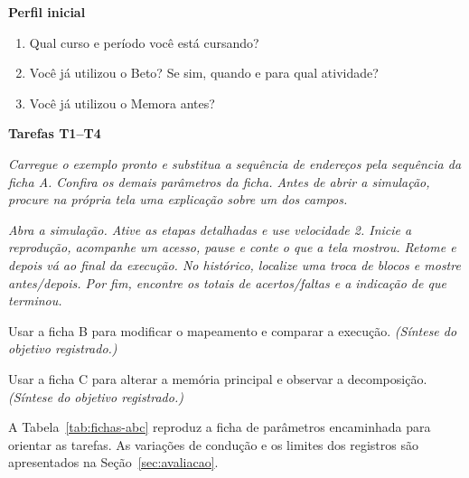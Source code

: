 
\textbf{Perfil inicial}
\begin{enumerate}
\item Qual curso e período você está cursando?
\item Você já utilizou o Beto? Se sim, quando e para qual atividade?
\item Você já utilizou o Memora antes?
\end{enumerate}


\textbf{Tarefas T1--T4}
\begin{description}[style=nextline,labelindent=0pt,leftmargin=0pt,labelsep=0pt,itemsep=3pt]
\item[\textbf{T1 --- Configuração e ajuda.}] \emph{Carregue o exemplo pronto e substitua a sequência de endereços pela sequência da ficha A. Confira os demais parâmetros da ficha. Antes de abrir a simulação, procure na própria tela uma explicação sobre um dos campos.}
\item[\textbf{T2 --- Execução e histórico.}] \emph{Abra a simulação. Ative as etapas detalhadas e use velocidade 2. Inicie a reprodução, acompanhe um acesso, pause e conte o que a tela mostrou. Retome e depois vá ao final da execução. No histórico, localize uma troca de blocos e mostre antes/depois. Por fim, encontre os totais de acertos/faltas e a indicação de que terminou.}
\item[\textbf{T3 --- Outros mapeamentos.}] Usar a ficha B para modificar o mapeamento e comparar a execução. \emph{(Síntese do objetivo registrado.)}
\item[\textbf{T4 --- Divisão do endereço.}] Usar a ficha C para alterar a memória principal e observar a decomposição. \emph{(Síntese do objetivo registrado.)}
\end{description}
A Tabela~\ref{tab:fichas-abc} reproduz a ficha de parâmetros encaminhada para orientar as tarefas. As variações de condução e os limites dos registros são apresentados na Seção~\ref{sec:avaliacao}.

